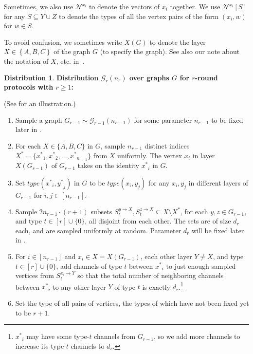 \documentclass[11pt]{article}
\theoremstyle{definition}
\newtheorem{mddistribution}{Distribution}
\newenvironment{Distribution}{\begin{tbox}\begin{mddistribution}}{\end{mddistribution}\end{tbox}}
\renewcommand{\geq}{\geqslant}
\newcommand{\set}[1]{\ensuremath{\left\{ #1 \right\}}}
\newenvironment{tbox}{\begin{tcolorbox}[
		enlarge top by=5pt,
		enlarge bottom by=5pt,
		 breakable,
		 boxsep=0pt,
                  left=4pt,
                  right=4pt,
                  top=10pt,
                  arc=4pt,
                  boxrule=1pt,toprule=1pt,
                  colback=white
                  ]%
	}
{\end{tcolorbox}}
\newcounter{mybox}
\renewcommand{\themybox}{\arabic{mybox}}
\newcommand{\namethebox}{\begin{center}\textbf{Box~\themybox} \end{center}}
\newcommand{\xstar}{\ensuremath{x^{*}}}
\newcommand{\Xstar}{\ensuremath{X^{*}}}
\newcommand{\ystar}{\ensuremath{y^{*}}}
\newcommand{\Nbtogether}[2]{\ensuremath{\mathcal{N}^{#1_{#2}}}}
\newcommand{\cG}{\ensuremath{\mathcal{G}}}
\begin{document}
Sometimes, we also use $\Nbtogether{x}{i}$ to denote the vectors of $x_i$ together. We use $\Nbtogether{x}{i}[S]$ for any $S \subseteq Y \cup Z$ to denote the types of all the vertex pairs of the form $(x_i, w)$ for $w \in S$. 

To avoid confusion, we sometimes write $X(G)$ to denote the layer $X \in \set{A,B,C}$ of the graph $G$ (to specify the graph). See also our note about the notation of $X$, etc. in~.  


\begin{Distribution}\label{box:cGr-definition}
	\textbf{Distribution $\cG_r(n_r)$ over graphs $G$ for $r$-round protocols with $r \geq 1$:}
	
	(See  for an illustration.)
	\begin{enumerate}[label=$(\arabic*)$]
		\item \label{item:Gr-Gr-1-sample}Sample a graph $G_{r-1} \sim \cG_{r-1}(n_{r-1})$ for some parameter $n_{r-1}$ to be fixed later in .
		\item \label{item:Gr-id-sample} For each $X \in \{A, B, C\}$ in $G$, sample $n_{r-1}$ distinct indices $\Xstar = \{ \xstar_1, \xstar_2, \ldots, \xstar_{n_{r-1}}\}$ from $X$ uniformly. The vertex $x_i$ in layer $X(G_{r-1})$ of $G_{r-1}$ 
		takes on the identity $\xstar_i$ in $G$.  
		\item Set $type(\xstar_i, \ystar_j)$ in $G$ to be $type(x_i,y_j)$ for any $x_i,y_j$ in different layers of $G_{r-1}$ for $i, j \in [n_{r-1}]$. %
		\item \label{item:Gr-neighbor-sample} Sample $2n_{r-1} \cdot (r+1)$ subsets $S^{y \to X}_t, S^{z \to X}_t \subseteq X \setminus \Xstar$, for each $y, z \in G_{r-1}$, and type $ t \in [r] \cup \{0\}$, all disjoint from each other. The sets are of size $d_r$ each, and are sampled uniformly at random. Parameter $d_r$ will be fixed later in .
		\item \label{item:Gr-degree-make} For $i \in[n_{r-1}]$ and $x_i \in X=X(G_{r-1})$, each other layer $Y\neq X$, and type $t \in [r] \cup \{0\}$, add channels of type $t$ between $\xstar_i$ to just enough sampled vertices from $S_t^{x_i \to Y}$ so that the total number of neighboring channels between $\xstar_i$ to any other layer $Y$ of type $t$ is exactly $d_r$.\footnote{$\xstar_i$ may have some type-$t$ channels from $G_{r-1}$, so we add more channels to increase its type-$t$ channels to $d_r$.}
	\item Set the type of all pairs of vertices, the types of which have not been fixed yet to be $r+1$. 
	\end{enumerate}
\end{Distribution}
\end{document}
